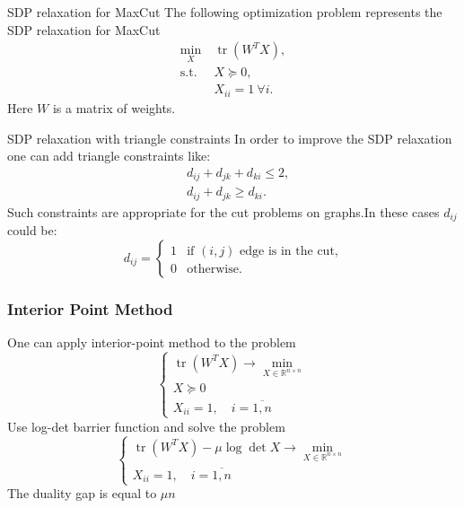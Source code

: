 \documentclass[10pt]{beamer}
\DeclareMathOperator{\tr}{tr}
\begin{document}
	\begin{frame}{SDP relaxation for MaxCut}
	    The following optimization problem represents the SDP relaxation for MaxCut
	    \begin{align*}
	        \min_X &~ \tr(W^T X),\\
	        \text{s.t.} &~ X \succeq 0,\\
	        &~ X_{ii} = 1 ~\forall i.
	    \end{align*}
	    Here $W$ is a matrix of weights.
	    
	    
	\end{frame}
        
        \begin{frame}{SDP relaxation with triangle constraints}
            In order to improve the SDP relaxation one can add triangle constraints like:
            \begin{align*}
                &d_{ij} + d_{jk} + d_{ki} \leq 2, \\
                &d_{ij} + d_{jk} \geq d_{ki}.
            \end{align*}
            Such constraints are appropriate for the cut problems on graphs.In these cases 
            $d_{ij}$ could be:
            \[
                d_{ij} = \begin{cases} 1 & \text{if } (i, j) \text{ edge is in the cut,} \\ 
                0 & \text{otherwise.}\end{cases}
            \]
            
        \end{frame}

	\begin{frame}
		\frametitle{Interior Point Method}
		
		One can apply interior-point method to the problem
		\[
			\begin{cases}
				\tr(W^T X) \rightarrow \min\limits_{X \in \mathbb R^{n \times n}} \\
				X \succeq 0 \\
				X_{ii} = 1, \quad i = \overline{1, n}
			\end{cases}
		\]
		Use log-det barrier function and solve the problem
		\[
			\begin{cases}
				\tr(W^T X) - \mu \log\det X \rightarrow \min\limits_{X \in \mathbb R^{n 
				\times n}} \\
				X_{ii} = 1, \quad i = \overline{1, n}
			\end{cases}
		\]
		The duality gap is equal to $\mu n$
	\end{frame}
	
\end{document}
